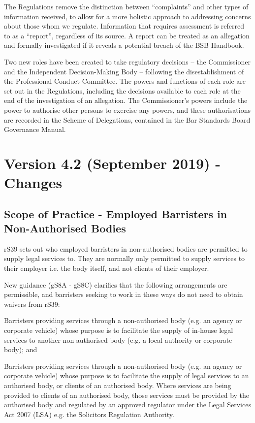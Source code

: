 The Regulations remove the distinction between “complaints” and other types of information received, to allow for a more holistic approach to addressing concerns about those whom we regulate. Information that requires assessment is referred to as a “report”, regardless of its source. A report can be treated as an allegation and formally investigated if it reveals a potential breach of the BSB Handbook.

Two new roles have been created to take regulatory decisions – the Commissioner and the Independent Decision-Making Body – following the disestablishment of the Professional Conduct Committee. The powers and functions of each role are set out in the Regulations, including the decisions available to each role at the end of the investigation of an allegation. The Commissioner’s powers include the power to authorise other persons to exercise any powers, and these authorisations are recorded in the Scheme of Delegations, contained in the Bar Standards Board Governance Manual.

\section*{Version 4.2 (September 2019) - Changes}
\subsection*{Scope of Practice - Employed Barristers in Non-Authorised Bodies}

rS39 sets out who employed barristers in non-authorised bodies are permitted to supply legal services to. They are normally only permitted to supply services to their employer i.e. the body itself, and not clients of their employer.

New guidance (gS8A - gS8C) clarifies that the following arrangements are permissible, and barristers seeking to work in these ways do not need to obtain waivers from rS39:
\begin{dotlist}
\item Barristers providing services through a non-authorised body (e.g. an agency or corporate vehicle) whose purpose is to facilitate the supply of in-house legal services to another non-authorised body (e.g. a local authority or corporate body); and
\item Barristers providing services through a non-authorised body (e.g. an agency or corporate vehicle) whose purpose is to facilitate the supply of legal services to an authorised body, or clients of an authorised body. Where services are being provided to clients of an authorised body, those services must be provided by the authorised body and regulated by an approved regulator under the Legal Services Act 2007 (LSA) e.g. the Solicitors Regulation Authority.\end{dotlist}


